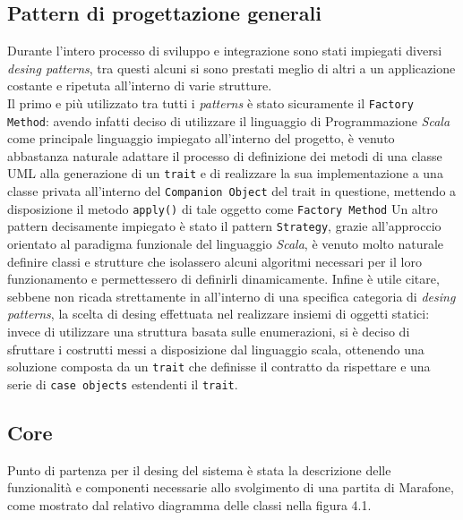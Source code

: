   \subsection {Pattern di progettazione generali}\label{subsec:details:generaldesingpattern}
  Durante l'intero processo di sviluppo e integrazione sono stati impiegati diversi \textit{desing patterns}, tra questi alcuni si sono prestati meglio di altri a un applicazione costante e ripetuta all'interno di varie strutture.\\
  Il primo e più utilizzato tra tutti i \textit{patterns} è stato sicuramente il \texttt{Factory Method}: avendo infatti deciso di utilizzare
  il linguaggio di Programmazione \textit{Scala} come principale linguaggio impiegato all'interno del progetto, è venuto abbastanza naturale adattare il processo di definizione dei metodi di una classe UML alla generazione di un \texttt{trait} e di realizzare la sua implementazione a una classe privata all'interno del \texttt{Companion Object} del trait in questione, mettendo a disposizione il metodo \texttt{apply()} di tale oggetto come \texttt{Factory Method}
  Un altro pattern decisamente impiegato è stato il pattern \texttt{Strategy}, grazie all'approccio orientato al paradigma funzionale del linguaggio \textit{Scala}, è venuto molto naturale definire classi e strutture che isolassero alcuni algoritmi necessari per il loro funzionamento e permettessero di definirli dinamicamente.
  Infine è utile citare, sebbene non ricada strettamente in all'interno di una specifica categoria di \textit{desing patterns}, la scelta di desing effettuata nel realizzare insiemi di oggetti statici: invece di utilizzare una struttura basata sulle enumerazioni, si è deciso di sfruttare i costrutti messi a disposizione dal linguaggio scala, ottenendo una soluzione composta da un \texttt{trait} che definisse il contratto da rispettare e una serie di \texttt{case objects} estendenti il \texttt{trait}.

  \subsection {Core}\label{subsec:details:core}
  Punto di partenza per il desing del sistema è stata la descrizione delle funzionalità e componenti necessarie allo svolgimento di una partita di Marafone, come mostrato dal relativo diagramma delle classi nella figura 4.1.

